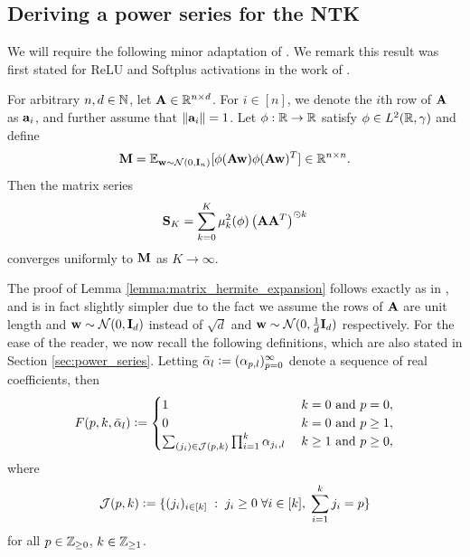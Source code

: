 
\subsection{Deriving a power series for the NTK}\label{appendix:subsec:deriving_power_series}

We will require the following minor adaptation of \citet[Lemma D.2]{marco}. We remark this result was first stated for ReLU and Softplus activations in the work of \citet[Lemma H.2]{solt_mod_over}. 


\begin{lemma}\label{lemma:matrix_hermite_expansion}
    For arbitrary $n,d \in \mathbb{N}$, let $\mathbf{A} \in \mathbb{R}^{n \times d}$. For $i \in [n]$, we denote the $i$th row of $\mathbf{A}$ as $\mathbf a_i$, and further assume that $\left\lVert\mathbf a_i\right\rVert =1$. Let $\phi: \mathbb{R} \rightarrow \mathbb{R}$ satisfy $\phi \in L^2(\mathbb{R}, \gamma)$ and define
    \[
    \mathbf{M} = \mathbb{E}_{\mathbf w \sim \mathcal{N}(0, \textbf{I}_{n})}[\phi(\mathbf{A}\mathbf w)\phi(\mathbf{A} \mathbf w)^T] \in \mathbb{R}^{n \times n}.
    \]
    Then the matrix series
    \[
    \mathbf{S}_K = \sum_{k = 0}^{K} \mu_k^2(\phi) \left(\mathbf{A} \mathbf{A}^T \right)^{\odot k}
    \]
    converges uniformly to $\mathbf{M}$ as $K \rightarrow \infty$.
\end{lemma}
The proof of Lemma \ref{lemma:matrix_hermite_expansion} follows exactly as in \cite[Lemma D.2]{marco}, and is in fact slightly simpler due to the fact we assume the rows of $\mathbf{A}$ are unit length and $\mathbf w \sim \mathcal{N}(0, \textbf{I}_d)$ instead of $\sqrt{d}$ and $\mathbf w \sim \mathcal{N}(0, \frac{1}{d}\textbf{I}_d)$ respectively. For the ease of the reader, we now recall the following definitions, which are also stated in Section \ref{sec:power_series}. Letting $\bar{\alpha}_l \vcentcolon= (\alpha_{p,l})_{p=0}^{\infty}$ denote a sequence of real coefficients, then
    \begin{equation}
            F(p,k,\bar{\alpha}_{l}) \vcentcolon= 
            \begin{cases}
                1 \; &k=0 \text{ and } p = 0, \\
                0 \; &k=0 \text{ and } p \geq 1,\\
                \sum_{(j_i) \in \mathcal{J}(p,k)} \prod_{i=1}^k \alpha_{j_i, l} \; &k\geq 1 \text{ and } p \geq 0,
            \end{cases}
    \end{equation}
    where
    \[
    \mathcal{J}(p,k) \vcentcolon= \{ (j_i)_{i \in [k]} \; : \; j_i \geq 0 \; \forall i \in [k], \; \sum_{i=1}^k j_i = p  \} 
    \]
    for all $p \in \mathbb{Z}_{\geq 0}$, $k \in \mathbb{Z}_{\geq 1}$. 
    
